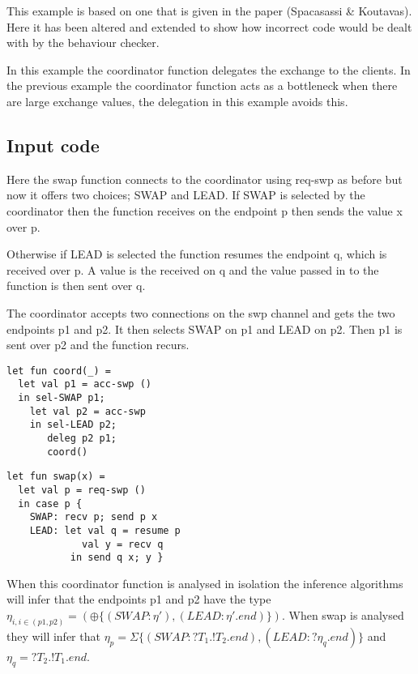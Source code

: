 This example is based on one that is given in the paper (Spacasassi \& Koutavas)\cite{paper1}. Here it has been altered and extended to show how incorrect code would be dealt with by the behaviour checker. 

In this example the coordinator function delegates the exchange to the clients. In the previous example the coordinator function acts as a bottleneck when there are large exchange values, the delegation in this example avoids this. 

\subsection{Input code}

Here the swap function connects to the coordinator using req-swp as before but now it offers two choices; SWAP and LEAD. If SWAP is selected by the coordinator then the function receives on the endpoint p then sends the value x over p. 

Otherwise if LEAD is selected the function resumes the endpoint q, which is received over p. A value is the received on q and the value passed in to the function is then sent over q. 

The coordinator accepts two connections on the swp channel and gets the two endpoints p1 and p2. It then selects SWAP on p1 and LEAD on p2. Then p1 is sent over p2 and the function recurs. 

\begin{minipage}{.45\textwidth}
\begin{lstlisting}[backgroundcolor=\color{white},numbers=none]
let fun coord(_) =
  let val p1 = acc-swp ()
  in sel-SWAP p1;
    let val p2 = acc-swp
    in sel-LEAD p2;
       deleg p2 p1;
       coord()
\end{lstlisting}
\end{minipage}
\hfill
\begin{minipage}{.45\textwidth}
\begin{lstlisting}[backgroundcolor=\color{white},numbers=none]
let fun swap(x) =
  let val p = req-swp ()
  in case p {
    SWAP: recv p; send p x
    LEAD: let val q = resume p
             val y = recv q
           in send q x; y }
\end{lstlisting}
\end{minipage}

When this coordinator function is analysed in isolation the inference algorithms will infer that the endpoints p1 and p2 have the type $\eta_{i, i \in (p1,p2)} = (\oplus \{(SWAP : \eta'), (LEAD : \eta'. end) \})$. When swap is analysed they will infer that $\eta_p = \Sigma\{(SWAP : ?T_1 .!T_2. end), (LEAD : ? \eta_q . end)\}$ and $\eta_q = ?T_2.!T_1.end$. 

